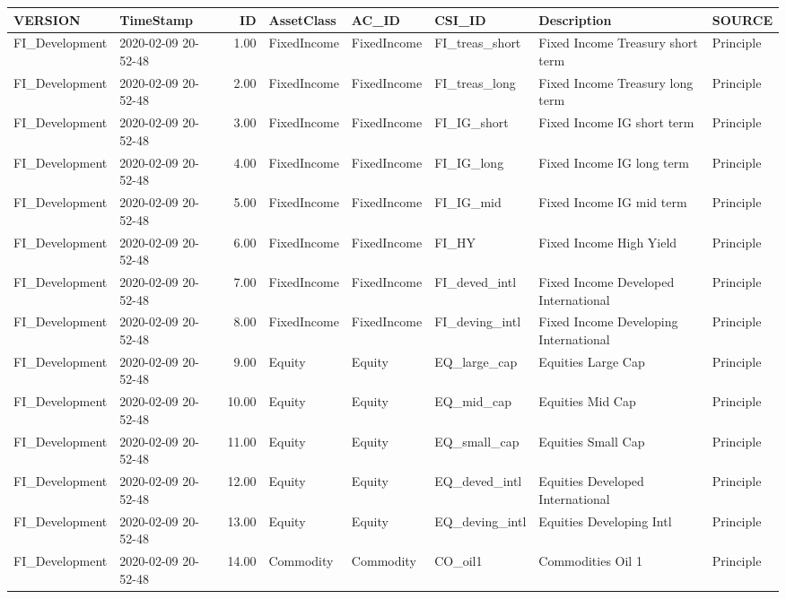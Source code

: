 \begin{longtable}{llrlllll}
  \hline
VERSION & TimeStamp & ID & AssetClass & AC\_ID & CSI\_ID & Description & SOURCE \\ 
  \hline
FI\_Development & 2020-02-09 20-52-48 & 1.00 & FixedIncome & FixedIncome & FI\_treas\_short & Fixed Income Treasury short term & Principle \\ 
  FI\_Development & 2020-02-09 20-52-48 & 2.00 & FixedIncome & FixedIncome & FI\_treas\_long & Fixed Income Treasury long term & Principle \\ 
  FI\_Development & 2020-02-09 20-52-48 & 3.00 & FixedIncome & FixedIncome & FI\_IG\_short & Fixed Income IG short term & Principle \\ 
  FI\_Development & 2020-02-09 20-52-48 & 4.00 & FixedIncome & FixedIncome & FI\_IG\_long & Fixed Income IG long term & Principle \\ 
  FI\_Development & 2020-02-09 20-52-48 & 5.00 & FixedIncome & FixedIncome & FI\_IG\_mid & Fixed Income IG mid term & Principle \\ 
  FI\_Development & 2020-02-09 20-52-48 & 6.00 & FixedIncome & FixedIncome & FI\_HY & Fixed Income High Yield & Principle \\ 
  FI\_Development & 2020-02-09 20-52-48 & 7.00 & FixedIncome & FixedIncome & FI\_deved\_intl & Fixed Income Developed International & Principle \\ 
  FI\_Development & 2020-02-09 20-52-48 & 8.00 & FixedIncome & FixedIncome & FI\_deving\_intl & Fixed Income Developing International & Principle \\ 
  FI\_Development & 2020-02-09 20-52-48 & 9.00 & Equity & Equity & EQ\_large\_cap & Equities Large Cap & Principle \\ 
  FI\_Development & 2020-02-09 20-52-48 & 10.00 & Equity & Equity & EQ\_mid\_cap & Equities Mid Cap & Principle \\ 
  FI\_Development & 2020-02-09 20-52-48 & 11.00 & Equity & Equity & EQ\_small\_cap & Equities Small Cap & Principle \\ 
  FI\_Development & 2020-02-09 20-52-48 & 12.00 & Equity & Equity & EQ\_deved\_intl & Equities Developed International & Principle \\ 
  FI\_Development & 2020-02-09 20-52-48 & 13.00 & Equity & Equity & EQ\_deving\_intl & Equities Developing Intl & Principle \\ 
  FI\_Development & 2020-02-09 20-52-48 & 14.00 & Commodity & Commodity & CO\_oil1 & Commodities Oil 1 & Principle \\ 

\end{longtable}
